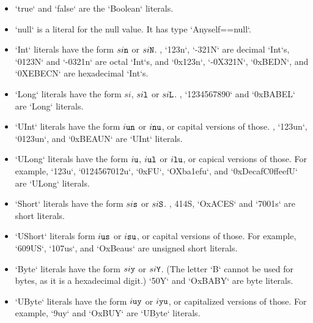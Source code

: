 \begin{itemize}

\item \xcd`true` and \xcd`false` are the \xcd`Boolean` literals. 

\item \xcd`null` is a literal for the null value.  It has type
      \xcd`Any{self==null}`.  

\item {}
\xcd`Int` literals have the form {$si{\tt n}$} or {$si{\tt N}$}. \Eg, \xcd`123n`,
      \xcd`-321N` are decimal \xcd`Int`s, \xcd`0123N` and \xcd`-0321n` are octal
      \xcd`Int`s, and \xcd`0x123n`, \xcd`-0X321N`,  \xcd`0xBEDN`, and \xcd`0XEBECN` are
      hexadecimal \xcd`Int`s.  

\item \xcd`Long` literals have the form {$si$}, {$si{\tt l}$} or {$si{\tt L}$}. \Eg, \xcd`1234567890`  and \xcd`0xBABEL` are \xcd`Long` literals. 

\item \xcd`UInt` literals have the form {$i{\tt un}$} or {$i{\tt nu}$}, or capital versions of those.
      \Eg, \xcd`123un`, \xcd`0123un`, and \xcd`0xBEAUN` are \xcd`UInt` literals.

\item \xcd`ULong` literals have the form {$i{\tt u}$}, {$i{\tt ul}$} or {$i{\tt lu}$}, or capical versions of those.  For example, 
      \xcd`123u`, \xcd`0124567012u`,  \xcd`0xFU`, \xcd`OXba1efu`, and \xcd`0xDecafC0ffeefU` are \xcd`ULong`
      literals. 

\item \xcd`Short` literals have the form {$si{\tt s}$} or
      {$si{\tt S}$}. \Eg,  414S, \xcd`OxACES` and \xcd`7001s` are short
      literals. 

\item \xcd`UShort` literals  form {$i{\tt us}$} or {$i{\tt
      su}$}, or capital versions of those.  For example, \xcd`609US`, 
      \xcd`107us`, and \xcd`OxBeaus` are unsigned short literals.

\item \xcd`Byte` literals have the form  {$si{\tt y}$} or
      {$si{\tt Y}$}.  (The letter \xcd`B` cannot be used for bytes, as it is
      a hexadecimal digit.)  \xcd`50Y` and \xcd`OxBABY` are byte literals.

\item \xcd`UByte` literals have the form {$i{\tt uy}$} or {$i{\tt yu}$}, or
      capitalized versions of those.  For example, \xcd`9uy` and \xcd`OxBUY`
      are \xcd`UByte` literals.
      



\end{itemize}
